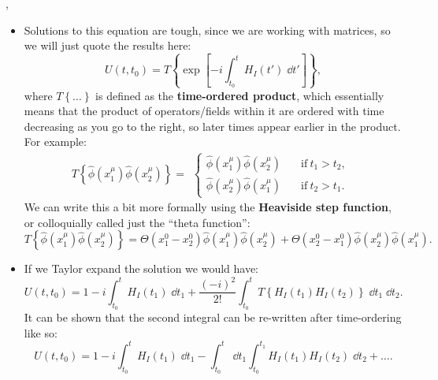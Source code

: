 \sep

\begin{itemize}
    \item Solutions to this equation are tough, since we are working with matrices, so we will just quote the results here:
        \begin{equation}
            U(t,t_0) = T\left\{ \exp\left[ -i\int_{t_0}^t H_I(t') \;\dd t' \right] \right\},
        \end{equation}
        where $T\left\{ \ldots \right\}$ is defined as the \textbf{time-ordered product}, which essentially means that the product of operators/fields within it are ordered with time decreasing as you go to the right, so later times appear earlier in the product. For example:
        \begin{equation*}
            T\left\{ \hat{\phi}(x^{\mu}_1)\hat{\phi}(x^{\mu}_2) \right\} = 
                \begin{alignedat}{1}
                \begin{cases}
                    \hat{\phi}(x^{\mu}_1)\hat{\phi}(x^{\mu}_2) \quad & \mathrm{if}\ t_1>t_2, \\
                    \hat{\phi}(x^{\mu}_2)\hat{\phi}(x^{\mu}_1) \quad & \mathrm{if}\ t_2>t_1.
                \end{cases}
                \end{alignedat}
        \end{equation*}
        We can write this a bit more formally using the \textbf{Heaviside step function}, or colloquially called just the ``theta function'':
        \begin{equation*}
            T\left\{ \hat{\phi}(x^{\mu}_1)\hat{\phi}(x^{\mu}_2) \right\} = \Theta(x_1^0 - x_2^0) \hat{\phi}(x^{\mu}_1)\hat{\phi}(x^{\mu}_2) + \Theta(x_2^0 - x_1^0) \hat{\phi}(x^{\mu}_2)\hat{\phi}(x^{\mu}_1).
        \end{equation*}
    \item If we Taylor expand the solution we would have:
        \begin{equation*}
            U(t,t_0) = 1 - i\int_{t_0}^t H_I(t_1)\;\dd t_1 + \frac{(-i)^2}{2!} \int_{t_0}^t T\left\{ H_I(t_1)H_I(t_2) \right\} \;\dd t_1 \;\dd t_2.
        \end{equation*}
        It can be shown that the second integral can be re-written after time-ordering like so:
        \begin{equation*}
            U(t,t_0) = 1 - i\int_{t_0}^t H_I(t_1)\;\dd t_1 - \int_{t_0}^t \;\dd t_1 \int_{t_0}^{t_1} H_I(t_1)H_I(t_2) \;\dd t_2 + \ldots.
        \end{equation*}
\end{itemize}



